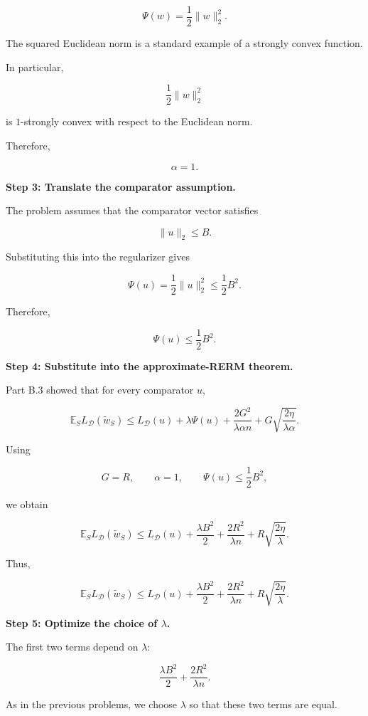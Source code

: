 \documentclass[11pt]{article}
\newcommand{\E}{\mathbb{E}}
\begin{document}
\begin{enumerate}
\begin{solutionbox}
\[
\Psi(w)
=
\frac12\|w\|_2^2.
\]

The squared Euclidean norm is a standard example of a strongly convex function.

In particular,

\[
\frac12\|w\|_2^2
\]

is \(1\)-strongly convex with respect to the Euclidean norm.

Therefore,

\[
\boxed{
\alpha=1.
}
\]

\medskip

\textbf{Step 3: Translate the comparator assumption.}

The problem assumes that the comparator vector satisfies

\[
\|u\|_2 \le B.
\]

Substituting this into the regularizer gives

\[
\Psi(u)
=
\frac12\|u\|_2^2
\le
\frac12 B^2.
\]

Therefore,

\[
\boxed{
\Psi(u)\le \frac12 B^2.
}
\]

\medskip

\textbf{Step 4: Substitute into the approximate-RERM theorem.}

Part B.3 showed that for every comparator \(u\),

\[
\E_S L_{\mathcal D}(\widetilde w_S)
\le
L_{\mathcal D}(u)
+
\lambda\Psi(u)
+
\frac{2G^2}{\lambda\alpha n}
+
G\sqrt{\frac{2\eta}{\lambda\alpha}}.
\]

Using

\[
G=R,
\qquad
\alpha=1,
\qquad
\Psi(u)\le \frac12 B^2,
\]

we obtain

\[
\E_S L_{\mathcal D}(\widetilde w_S)
\le
L_{\mathcal D}(u)
+
\frac{\lambda B^2}{2}
+
\frac{2R^2}{\lambda n}
+
R\sqrt{\frac{2\eta}{\lambda}}.
\]

Thus,

\[
\boxed{
\E_S L_{\mathcal D}(\widetilde w_S)
\le
L_{\mathcal D}(u)
+
\frac{\lambda B^2}{2}
+
\frac{2R^2}{\lambda n}
+
R\sqrt{\frac{2\eta}{\lambda}}
}.
\]

\medskip

\textbf{Step 5: Optimize the choice of \(\lambda\).}

The first two terms depend on \(\lambda\):

\[
\frac{\lambda B^2}{2}
+
\frac{2R^2}{\lambda n}.
\]

As in the previous problems, we choose \(\lambda\) so that these two terms are equal.


\end{solutionbox}
\end{enumerate}
\end{document}
